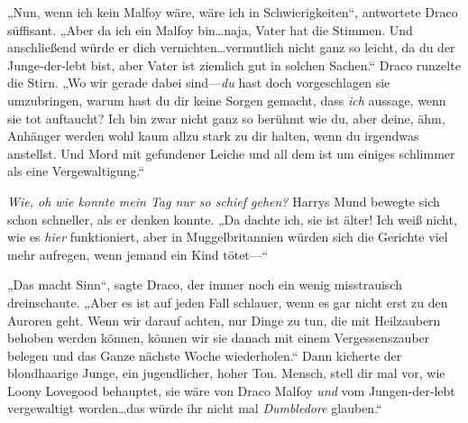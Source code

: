 „Nun, wenn ich kein Malfoy wäre, wäre ich in Schwierigkeiten“, antwortete Draco süffisant. „Aber da ich ein Malfoy bin…naja, Vater hat die Stimmen. Und anschließend würde er dich vernichten…vermutlich nicht ganz so leicht, da du der Junge-der-lebt bist, aber Vater ist ziemlich gut in solchen Sachen.“ Draco runzelte die Stirn. „Wo wir gerade dabei sind—\emph{du} hast doch vorgeschlagen sie umzubringen, warum hast du dir keine Sorgen gemacht, dass \emph{ich} aussage, wenn sie tot auftaucht? Ich bin zwar nicht ganz so berühmt wie du, aber deine, ähm, Anhänger werden wohl kaum allzu stark zu dir halten, wenn du irgendwas anstellst. Und Mord mit gefundener Leiche und all dem ist um einiges schlimmer als eine Vergewaltigung.“

\emph{Wie, oh wie konnte mein Tag nur so schief gehen?} Harrys Mund bewegte sich schon schneller, als er denken konnte. „Da dachte ich, sie ist älter! Ich weiß nicht, wie es \emph{hier} funktioniert, aber in Muggelbritannien würden sich die Gerichte viel mehr aufregen, wenn jemand ein Kind tötet—“

„Das macht Sinn“, sagte Draco, der immer noch ein wenig misstrauisch dreinschaute.
„Aber es ist auf jeden Fall schlauer, wenn es gar nicht erst zu den Auroren geht. Wenn wir darauf achten, nur Dinge zu tun, die mit Heilzaubern behoben werden können, können wir sie danach mit einem Vergessenszauber belegen und das Ganze nächste Woche wiederholen.“
Dann kicherte der blondhaarige Junge, ein jugendlicher, hoher Ton.
Mensch, stell dir mal vor, wie Loony Lovegood behauptet, sie wäre von Draco Malfoy \emph{und} vom Jungen-der-lebt vergewaltigt worden…das würde ihr nicht mal \emph{Dumbledore} glauben.“

